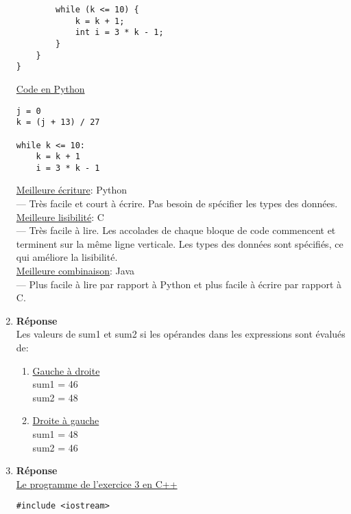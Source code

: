 \documentclass[12pt]{book}
\begin{document}
\begin{enumerate}
\begin{verbatim}
        while (k <= 10) {
            k = k + 1;
            int i = 3 * k - 1;
        }
    }
}
\end{verbatim}
    \underline{Code en Python}
\begin{verbatim}
j = 0
k = (j + 13) / 27

while k <= 10:
    k = k + 1
    i = 3 * k - 1
\end{verbatim}

\underline{Meilleure écriture}: Python\\
--- Très facile et court à écrire. Pas besoin de spécifier les types des données.\\
\underline{Meilleure lisibilité}: C\\
--- Très facile à lire. Les accolades de chaque bloque de code commencent et terminent sur la même ligne verticale. Les types des données sont spécifiés, ce qui améliore la lisibilité.\\
\underline{Meilleure combinaison}: Java\\
--- Plus facile à lire par rapport à Python et plus facile à écrire par rapport à C.

\newpage
    \item \textbf{Réponse}\\

    Les valeurs de sum1 et sum2 si les opérandes dans les expressions sont évalués de:
    \begin{enumerate}
        \item \underline{Gauche à droite}\\

        sum1 = 46\\
        sum2 = 48\\
        
        \item \underline{Droite à gauche}\\

        sum1 = 48\\
        sum2 = 46\\
    \end{enumerate}

\newpage
    \item \textbf{Réponse}\\
    \underline{Le programme de l'exercice 3 en C++}
\begin{verbatim}
#include <iostream>


\end{verbatim}
\end{enumerate}
\end{document}
